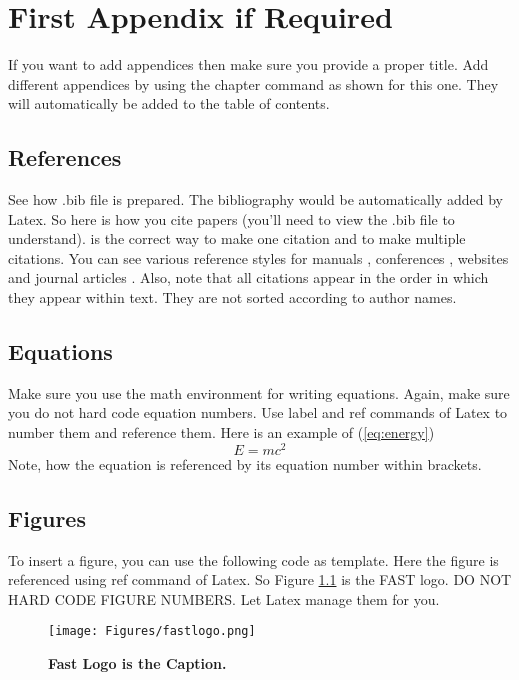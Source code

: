 \documentclass{FastFyp}
\begin{document}
{

}
\appendix
\chapter{First Appendix if Required}
If you want to add appendices then make sure you provide a proper title.  Add different appendices by using the chapter command as shown for this one.  They will automatically be added to the table of contents.

\section{References}
See how .bib file is prepared.  The bibliography would be automatically added by Latex.  So here is how you cite papers (you'll need to view the .bib file to understand).  \cite{ref:Duda:2000} is the correct way to make one citation and \cite{ref:Bishop:2006,ref:SVMGuide} to make multiple citations. You can see various reference styles for manuals \cite{ref:SVMGuide}, conferences \cite{ref:guyon:2007}, websites \cite{ref:IJCNNChallenge:2007} and journal articles \cite{ref:guyon:2007a}.  Also, note that all citations appear in the order in which they appear within text.  They are not sorted according to author names.

\section{Equations}
Make sure you use the math environment for writing equations.  Again, make sure you do not hard code equation numbers.  Use label and ref commands of Latex to number them and reference them.  Here is an example of (\ref{eq:energy})
\begin{equation}\label{eq:energy}
E = mc^2
\end{equation}
Note, how the equation is referenced by its equation number within brackets.  

\section{Figures}
To insert a figure, you can use the following code as template.  Here the figure is referenced using ref command of Latex.  So Figure \ref{fig:fast} is the FAST logo.  DO NOT HARD CODE FIGURE NUMBERS.  Let Latex manage them for you.

\begin{figure}[!hbt]
\centering
\texttt{[image: Figures/fastlogo.png]}
{\caption {\label{fig:fast}{\textbf{Fast Logo is the Caption.}}}}  
\end{figure}
\end{document}
